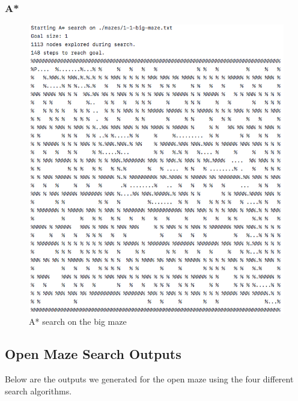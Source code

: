 \documentclass[titlepage]{article}
\begin{document}
\subsubsection*{A*}
\begin{figure}[h!]
\includegraphics[width=\linewidth]{astarbig.png}
\caption{A* search on the big maze}
\label{fig:greedybig}
\end{figure}

\newpage

\subsection*{Open Maze Search Outputs}
Below are the outputs we generated for the open maze using the four different search algorithms. 
\end{document}
